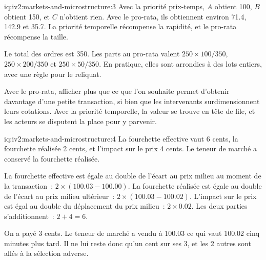 \begin{solution}{iq:iv2:markets-and-microstructure:3}
Avec la priorité prix-temps, $A$ obtient 100, $B$ obtient 150, et $C$ n'obtient rien. Avec le pro-rata, ils obtiennent environ 71.4, 142.9 et 35.7. La priorité temporelle récompense la rapidité, et le pro-rata récompense la taille.

Le total des ordres est 350. Les parts au pro-rata valent $250 \times 100/350$, $250 \times 200/350$ et $250 \times 50/350$. En pratique, elles sont arrondies à des lots entiers, avec une règle pour le reliquat.

Avec le pro-rata, afficher plus que ce que l'on souhaite permet d'obtenir davantage d'une petite transaction, si bien que les intervenants surdimensionnent leurs cotations. Avec la priorité temporelle, la valeur se trouve en tête de file, et les acteurs se disputent la place pour y parvenir.

\end{solution}

\begin{solution}{iq:iv2:markets-and-microstructure:4}
La fourchette effective vaut 6 cents, la fourchette réalisée 2 cents, et l'impact sur le prix 4 cents. Le teneur de marché a conservé la fourchette réalisée.

La fourchette effective est égale au double de l'écart au prix milieu au moment de la transaction~: $2 \times (100.03 - 100.00)$. La fourchette réalisée est égale au double de l'écart au prix milieu ultérieur~: $2 \times (100.03 - 100.02)$. L'impact sur le prix est égal au double du déplacement du prix milieu~: $2 \times 0.02$. Les deux parties s'additionnent~: $2 + 4 = 6$.

On a payé 3 cents. Le teneur de marché a vendu à 100.03 ce qui vaut 100.02 cinq minutes plus tard. Il ne lui reste donc qu'un cent sur ses 3, et les 2 autres sont allés à la sélection adverse.

\end{solution}

